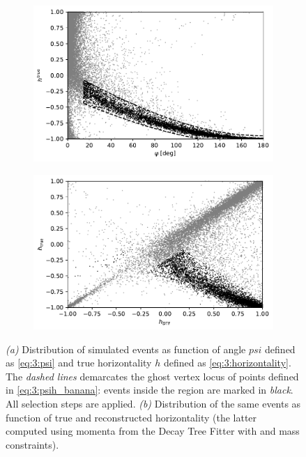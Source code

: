 \begin{figure}[t]
	\centering
	\begin{subfigure}{.45\textwidth}
		\includegraphics[width=\textwidth]{graphics/03-vertex_reconstruction/psi_vs_htrue.pdf}
		\caption{}
		\label{fig:3:psi_vs_htrue}
	\end{subfigure}
	\begin{subfigure}{.45\textwidth}
		\includegraphics[width=\textwidth]{graphics/03-vertex_reconstruction/hreco_vs_htrue.pdf}
		\caption{}
		\label{fig:3:hreco_vs_htrue}
	\end{subfigure}
	\caption{\textit{(a)} Distribution of simulated \demonstratorshort events as function of angle $psi$ defined as \eqref{eq:3:psi} and true horizontality $h$ defined as \eqref{eq:3:horizontality}. The \textit{dashed lines} demarcates the ghost vertex locus of points defined in \eqref{eq:3:psih_banana}: events inside the region are marked in \textit{black}. All selection steps are applied. \textit{(b)} Distribution of the same events as function of true and reconstructed horizontality (the latter computed using momenta from the Decay Tree Fitter with \jpsi and \lz mass constraints).}
\end{figure}

